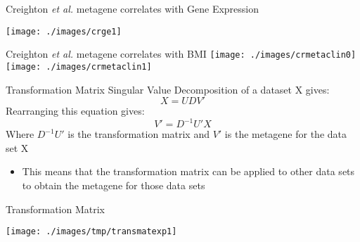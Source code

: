 \documentclass[handout]{beamer}
\begin{document}

\begin{frame}{\normalsize Creighton \textit{et al.} metagene correlates with Gene Expression}
	\begin{center}
		\texttt{[image: ./images/crge1]}
	\end{center}
\end{frame}

\begin{frame}{Creighton \textit{et al.} metagene correlates with BMI}
	\hspace{-4.0ex}
	\texttt{[image: ./images/crmetaclin0]}
	\texttt{[image: ./images/crmetaclin1]}
\end{frame}

\begin{frame}{Transformation Matrix}
	Singular Value Decomposition of a dataset X gives:
	\begin{equation*}
		X = UDV'
	\end{equation*}
	Rearranging this equation gives:
	\begin{equation*}
		V' = D^{-1}U'X
	\end{equation*}
	Where $D^{-1}U'$ is the transformation matrix and $V'$ is the metagene for the data set X
	{\footnotesize
		\begin{itemize}
			\item This means that the transformation matrix can be applied to other data sets to obtain the metagene for those data sets
		\end{itemize}
	}
\end{frame}

\begin{frame}{Transformation Matrix}
	\begin{center}
		\texttt{[image: ./images/tmp/transmatexp1]}
	\end{center}
\end{frame}
\end{document}
